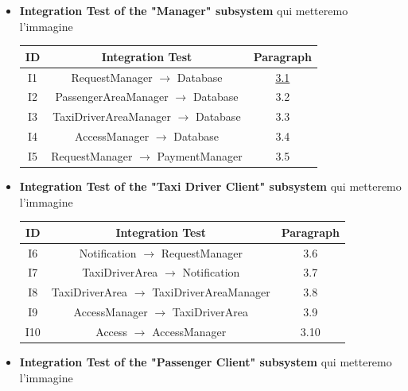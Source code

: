 \documentclass[18pt,oneside,a4paper, titlepage]{article}
\begin{document}
			\begin{itemize}
				
				
				\item \textbf{Integration Test of the "Manager" subsystem }
					qui metteremo l'immagine
					\begin{center}
						\centering
						\begin{tabular}{c c c}
							\hline \textbf{ID} & \textbf{Integration Test} & \textbf{Paragraph} \\
							\hline		I1 & RequestManager $\rightarrow$ Database & \hyperlink{chapter 3.1}{3.1}\\
							\hline		I2 & PassengerAreaManager $\rightarrow$ Database & 3.2 \\
							\hline		I3 & TaxiDriverAreaManager $\rightarrow$ Database & 3.3\\
							\hline		I4 & AccessManager $\rightarrow$ Database & 3.4 \\
							\hline		I5 & RequestManager $\rightarrow$ PaymentManager & 3.5 \\
							\hline
						\end{tabular}
					\end{center}
				\item \textbf{Integration Test of the "Taxi Driver Client" subsystem }
					qui metteremo l'immagine
					\begin{center}
						\centering
						\begin{tabular}{c c c}
							\hline \textbf{ID} & \textbf{Integration Test} & \textbf{Paragraph} \\
							\hline		I6 & Notification $\rightarrow$ RequestManager & 3.6\\
							\hline		I7 & TaxiDriverArea $\rightarrow$ Notification & 3.7 \\
							\hline		I8 & TaxiDriverArea $\rightarrow$ TaxiDriverAreaManager & 3.8\\
							\hline		I9 & AccessManager $\rightarrow$ TaxiDriverArea & 3.9 \\
							\hline		I10 & Access $\rightarrow$ AccessManager & 3.10 \\
							\hline
						\end{tabular}
					\end{center}
				\item \textbf{Integration Test of the "Passenger Client" subsystem}
					qui metteremo l'immagine
					\begin{center}
						\centering
						\begin{tabular}{c c c}

\end{tabular}
\end{center}
\end{itemize}
\end{document}
